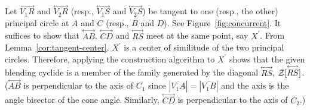 Let $\stackrel{\longleftrightarrow}{V_1R}$ and 
$\stackrel{\longleftrightarrow}{V_2R}$ (resp., 
$\stackrel{\longleftrightarrow}{V_1S}$ and
$\stackrel{\longleftrightarrow}{V_2S}$) be tangent to one (resp., the other)
principal circle at $A$ and $C$ (resp., $B$ and $D$).
See Figure~\ref{fig:concurrent}.
It suffices to show that $\stackrel{\longleftrightarrow}{AB}$,
$\stackrel{\longleftrightarrow}{CD}$ and $\stackrel{\longleftrightarrow}{RS}$
meet at the same point, say $X^\prime$.  
From Lemma~\ref{cor:tangent-center}, $X^\prime$ is a center of similitude
of the two principal circles.   Therefore, applying the construction 
algorithm to $X^\prime$ shows that the given blending cyclide 
is a member of the family generated by the diagonal 
$\stackrel{\longleftrightarrow}{RS}$, 
${\cal Z}[\stackrel{\longleftrightarrow}{RS}]$.
($\stackrel{\longleftrightarrow}{AB}$ is perpendicular to the axis of $C_1$
since $|\overline{V_1A}|=|\overline{V_1B}|$ and the axis is the angle bisector
of the cone angle.   Similarly, 
$\stackrel{\longleftrightarrow}{CD}$ is perpendicular to the axis of $C_2$.)

